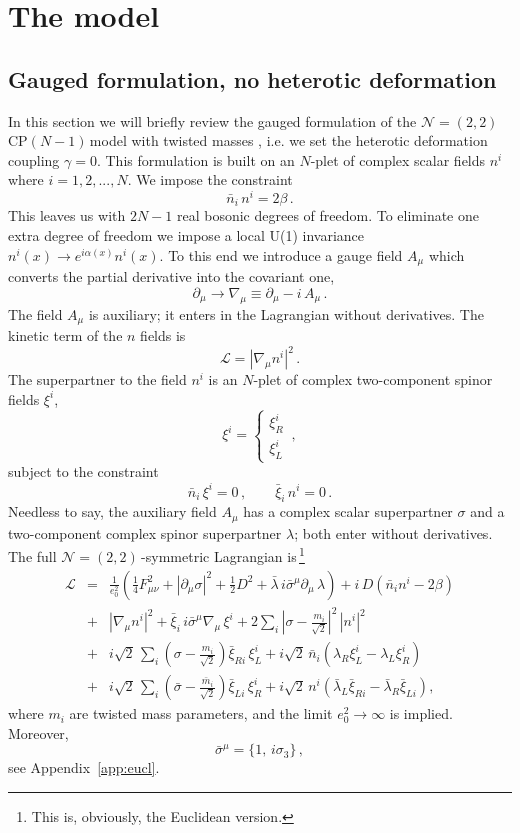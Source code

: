 \documentclass[epsfig,12pt]{article}
\def\beq{\begin{equation}}
\def\eeq{\end{equation}}
\def\beqn{\begin{eqnarray}}
\def\eeqn{\end{eqnarray}}
\newcommand{\ntt}{${\mathcal N}=(2,2)\,$}
\newcommand{\cpn}{CP$(N-1)\,$}
\newcommand{\cell}{{\mathcal L}}
\newcommand{\pt}{\partial}
\def\beqn{\begin{eqnarray}}
\def\eeqn{\end{eqnarray}}
\def\beq{\begin{equation}}
\def\eeq{\end{equation}}
\begin{document}
\section{The model}
\label{mmod}
\setcounter{equation}{0}

\subsection{Gauged formulation, no heterotic deformation}

In this section we will briefly review the gauged formulation \cite{W79,W93} of
the \mbox{\ntt} \cpn model with twisted masses
\cite{twisted}, i.e. we set the heterotic deformation coupling
$\gamma = 0$.
This formulation is built on an $N$-plet of complex scalar fields $n^i$ where $i=1,2,...,N$.
We impose the constraint
\beq
\bar n_i \,n^i = 2\beta \,.
\label{m31}
\eeq
This leaves us with $2N-1$ real bosonic degrees of freedom. To eliminate one extra degree
of freedom we impose a local U(1) invariance $n^i(x)\to e^{i\alpha(x)} n^i(x)$.
To this end we introduce a gauge field $A_\mu$ which converts the partial derivative into the
covariant one,
\beq
\partial_\mu\to \nabla_\mu \equiv \partial_\mu -i\,  A_\mu\,.
\label{m32}
\eeq
The field $A_\mu$ is auxiliary; it enters in the Lagrangian without derivatives. The kinetic term of the
$n$ fields is
\beq
\cell  = \left|\nabla_\mu n^i\right|^2\,.
\label{m33}
\eeq
The superpartner to the field $n^i$ is an $N$-plet of complex two-component spinor fields $\xi^i$,
\beq
\xi^i =\left\{\begin{array}{l}
\xi^i_R\\[2mm]
\xi^i_L
\end{array}
\right.\,,
\label{m34}
\eeq
subject to the constraint
\beq
\bar{n}_i\,\xi^i =0\,,\qquad \bar\xi_i\,n^i = 0\,.
\label{npxi}
\eeq
Needless to say, the auxiliary field $A_\mu$ has a complex scalar superpartner $\sigma$ 
and a two-component complex spinor superpartner $\lambda$; both enter without derivatives.
The full \ntt-symmetric Lagrangian is\,\footnote{This is, obviously, the Euclidean version.}
\beqn
\cell &=& 
\frac{1}{e_0^2}\left(\frac{1}{4} F_{\mu\nu}^2 +\left|\pt_\mu\sigma\right|^2 + \frac{1}{2}D^2
+\bar\lambda \, i\bar{\sigma}^\mu\pt_\mu\,\lambda
\right) + i\,D\left(\bar{n}_i n^i -2\beta
\right)
\nonumber\\[3mm]
&+&
\left|\nabla_\mu n^i\right|^2+ \bar{\xi}_i\, i\bar{\sigma}^\mu\nabla_\mu\,\xi^i
+ 2\sum_i\left|\sigma-\frac{m_i}{\sqrt 2}\right|^2\, |n^i|^2
\nonumber\\[3mm]
&+&
i\sqrt{2}\,\sum_i \left( \sigma -\frac{m_i}{\sqrt 2}\right)\bar\xi_{Ri}\, \xi^i_L +i\sqrt{2}\,\bar{n}_i
\left(\lambda_R\xi^i_L - \lambda_L\xi^i_R
\right)
\nonumber\\
&+&
i\sqrt{2}\,\sum_i \left( \bar\sigma -\frac{\bar{m}_i}{\sqrt 2}\right)\bar\xi_{Li}\, \xi^i_R +i\sqrt{2}\,{n}^i
\left(\bar\lambda_L\bar\xi_{Ri} - \bar\lambda_R\bar\xi_{Li}
\right),
\label{bee31}
\eeqn
where $m_i$ are twisted mass parameters, and the limit $e_0^2\to\infty$ is implied. 
Moreover,
\beq
\bar\sigma^\mu = \{1,\,i\sigma_3\}\,,
\label{wtpi3}
\eeq
see Appendix~\ref{app:eucl}.
\end{document}
